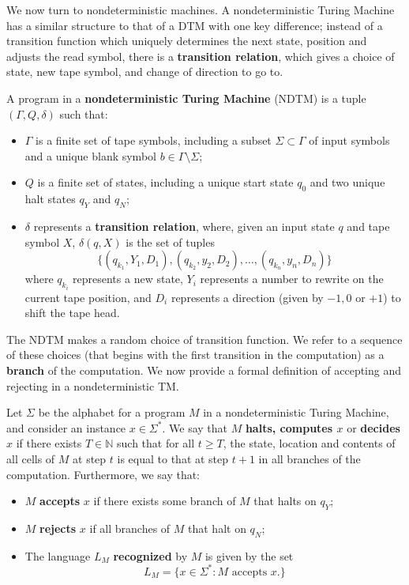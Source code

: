 We now turn to nondeterministic machines. A nondeterministic Turing Machine has a similar structure to that of a DTM with one key difference; instead of a transition function which uniquely determines the next state, position and adjusts the read symbol, there is a \textbf{transition relation}, which gives a choice of state, new tape symbol, and change of direction to go to.

\begin{definition}
    A program in a \textbf{nondeterministic Turing Machine} (NDTM) is a tuple $(\Gamma,Q,\delta)$ such that:
    \begin{itemize}
        \item $\Gamma$ is a finite set of tape symbols, including a subset $\Sigma \subset \Gamma$ of input symbols and a unique blank symbol $b \in \Gamma \setminus \Sigma$;
        \item $Q$ is a finite set of states, including a unique start state $q_0$ and two unique halt states $q_Y$ and $q_N$;
        \item $\delta$ represents a \textbf{transition relation}, where, given an input state $q$ and tape symbol $X$, $\delta(q,X)$ is the set of tuples
        \[
        \{ (q_{k_1},Y_1,D_1), (q_{k_2},y_2,D_2), \dots, (q_{k_n},y_n,D_n) \}
        \]
        where $q_{k_i}$ represents a new state, $Y_i$ represents a number to rewrite on the current tape position, and $D_i$ represents a direction (given by $-1, 0$ or $+1$) to shift the tape head.
    \end{itemize}
\end{definition}

The NDTM makes a random choice of transition function. We refer to a sequence of these choices (that begins with the first transition in the computation) as a \textbf{branch} of the computation. We now provide a formal definition of accepting and rejecting in a nondeterministic TM.

\begin{definition}
    Let $\Sigma$ be the alphabet for a program $M$ in a nondeterministic Turing Machine, and consider an instance $x \in \Sigma^*$. We say that $M$ \textbf{halts, computes $x$} or \textbf{decides $x$} if there exists $T \in \mathbb{N}$ such that for all $t \geq T$, the state, location and contents of all cells of $M$ at step $t$ is equal to that at step $t+1$ in all branches of the computation. Furthermore, we say that:
    \begin{itemize}
        \item $M$ \textbf{accepts} $x$ if there exists some branch of $M$ that halts on $q_Y$;
        \item $M$ \textbf{rejects} $x$ if all branches of $M$ that halt on $q_N$;
        \item The language $L_M$ \textbf{recognized} by $M$ is given by the set \[L_M = \{x \in \Sigma^*:\text{$M$ accepts $x$}.\}\]
    \end{itemize}
\end{definition}

